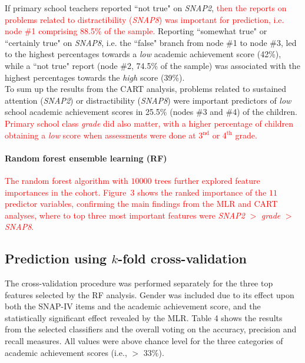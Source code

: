 \documentclass[10pt,letterpaper]{article}
\begin{document}
{{%
 
If primary school teachers reported ``not true" on {\it SNAP2},  \textcolor{red}{then the reports on problems related to distractibility ({\it SNAP8}) was important for prediction, 
i.e. node \#1 comprising 88.5\% of the sample.} 
Reporting ``somewhat true" or ``certainly true"  on {\it SNAP8}, i.e. the ``false" branch from node \#1 to node \#3, led to the highest percentages towards a {\it low} 
academic achievement score (42\%), while a ``not true" report (node \#2, 74.5\% of the sample) was associated with the highest percentages towards the {\it high} score (39\%). \\
	
To sum up the results from the CART analysis, problems related to sustained attention ({\it SNAP2}) or distractibility ({\it SNAP8}) were important predictors of {\it low} school 
academic achievement scores in  25.5\% (nodes \#3 and \#4) of the children.  \textcolor{red}{Primary school class {\it grade} did also matter, with a higher percentage of children 
obtaining a {\it low} score when assessments were done at 3$^{\text{nd}}$ or 4$^{\text{th}}$ grade.}  \\ 

\paragraph{Random forest ensemble learning (RF)}
\textcolor{red}{The random forest algorithm with $10000$ trees further explored feature importances in the cohort. 
Figure~3 shows the ranked importance of the $11$ predictor variables, 
confirming the main findings from the MLR and CART analyses, where to top three most important features were {\it SNAP2}  $>$ {\it grade}  $>$  {\it SNAP8}.}  \\


\subsection*{Prediction using $k$-fold cross-validation}

The cross-validation procedure was performed separately for the three top features selected by the RF analysis. Gender was included due to its effect upon both the SNAP-IV items and the academic achievement score, and the statistically significant effect revealed by the MLR.  
Table 4 shows the results from the selected classifiers and the overall voting on the accuracy, precision and recall measures. All values were above chance level for the three categories of academic achievement scores (i.e., $>$ 33\%). 



}}
\end{document}

